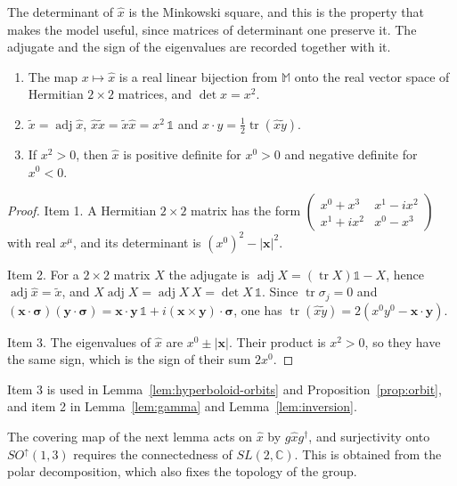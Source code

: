 The determinant of $\hat{x}$ is the Minkowski square, and this is the property that makes the model useful, since matrices of determinant one preserve it. The adjugate and the sign of the eigenvalues are recorded together with it.

\begin{lemma}\label{lem:hermitian-model}
	\begin{enumerate}
		\item The map $x\mapsto\hat{x}$ is a real linear bijection from $\mathbb{M}$ onto the real vector space of Hermitian $2\times2$ matrices, and $\det\hat{x}=x^2$.
		\item $\tilde{x}=\operatorname{adj}\hat{x}$, $\hat{x}\tilde{x}=\tilde{x}\hat{x}=x^2\,\mathbb{1}$ and $x\cdot y=\tfrac12\operatorname{tr}(\hat{x}\tilde{y})$.
		\item If $x^2>0$, then $\hat{x}$ is positive definite for $x^0>0$ and negative definite for $x^0<0$.
	\end{enumerate}
\end{lemma}

\begin{proof}
	Item 1. A Hermitian $2\times2$ matrix has the form $\begin{pmatrix}x^0+x^3&x^1-ix^2\\x^1+ix^2&x^0-x^3\end{pmatrix}$ with real $x^\mu$, and its determinant is $(x^0)^2-|\mathbf{x}|^2$.
	
	Item 2. For a $2\times2$ matrix $X$ the adjugate is $\operatorname{adj}X=(\operatorname{tr}X)\mathbb{1}-X$, hence $\operatorname{adj}\hat{x}=\tilde{x}$, and $X\operatorname{adj}X=\operatorname{adj}X\,X=\det X\,\mathbb{1}$. Since $\operatorname{tr}\sigma_j=0$ and $(\mathbf{x}\cdot\boldsymbol{\sigma})(\mathbf{y}\cdot\boldsymbol{\sigma})=\mathbf{x}\cdot\mathbf{y}\,\mathbb{1}+i(\mathbf{x}\times\mathbf{y})\cdot\boldsymbol{\sigma}$, one has $\operatorname{tr}(\hat{x}\tilde{y})=2(x^0y^0-\mathbf{x}\cdot\mathbf{y})$.
	
	Item 3. The eigenvalues of $\hat{x}$ are $x^0\pm|\mathbf{x}|$. Their product is $x^2>0$, so they have the same sign, which is the sign of their sum $2x^0$.
\end{proof}

\noindent Item 3 is used in Lemma~\ref{lem:hyperboloid-orbits} and Proposition~\ref{prop:orbit}, and item 2 in Lemma~\ref{lem:gamma} and Lemma~\ref{lem:inversion}.

The covering map of the next lemma acts on $\hat{x}$ by $g\hat{x}g^\dagger$, and surjectivity onto $SO^\uparrow(1,3)$ requires the connectedness of $SL(2,\mathbb{C})$. This is obtained from the polar decomposition, which also fixes the topology of the group.


